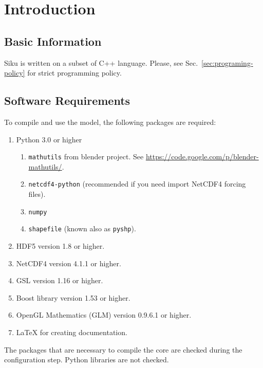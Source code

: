 
\chapter{Introduction}

\section{Basic Information}

Siku is written on a subset of C++ language. Please, see
Sec.~\ref{sec:programing-policy} for strict programming policy.

\section{Software Requirements}

To compile and use the model, the following packages are required:
\begin{enumerate}
\item Python 3.0 or higher
  \begin{enumerate}
  \item \texttt{mathutils} from blender project. 
    See \url{https://code.google.com/p/blender-mathutils/}.
  \item \texttt{netcdf4-python} (recommended if you need import
    NetCDF4 forcing files).
  \item \texttt{numpy}
  \item \texttt{shapefile} (known also as \texttt{pyshp}).
  \end{enumerate}
\item HDF5 version 1.8 or higher.
\item NetCDF4 version 4.1.1 or higher.
\item GSL version 1.16 or higher.
\item Boost library version 1.53 or higher.
\item OpenGL Mathematics (GLM) version 0.9.6.1 or higher.
\item \LaTeX\/ for creating documentation.
\end{enumerate}

The packages that are necessary to compile the core are checked during
the configuration step. Python libraries are not checked.

